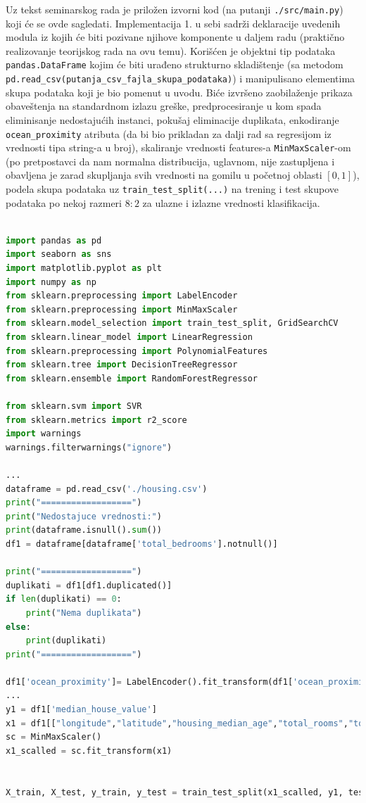 \documentclass[fontsize=12bp, paper=a4]{scrarticle}
\begin{document}



Uz tekst seminarskog rada je priložen izvorni kod (na putanji \verb|./src/main.py|) koji će se ovde sagledati. Implementacija 1. u sebi sadrži deklaracije uvedenih modula iz kojih će biti pozivane njihove komponente u daljem radu (praktično realizovanje teorijskog rada na ovu temu\cite{mojRad}). Korišćen je objektni tip podataka \verb|pandas.DataFrame|\cite{pandasDF} kojim će biti urađeno strukturno skladištenje (sa metodom \verb|pd.read_csv(putanja_csv_fajla_skupa_podataka)|) i manipulisano elementima skupa podataka koji je bio pomenut u uvodu. Biće izvršeno zaobilaženje prikaza obaveštenja na standardnom izlazu greške, predprocesiranje u kom spada eliminisanje nedostajućih instanci, pokušaj eliminacije duplikata, enkodiranje \verb|ocean_proximity| atributa (da bi bio prikladan za dalji rad sa regresijom iz vrednosti tipa string-a u broj)\cite{labelEncoding}, skaliranje vrednosti features-a \verb|MinMaxScaler|-om (po pretpostavci da nam normalna distribucija, uglavnom, nije zastupljena i obavljena je zarad skupljanja svih vrednosti na gomilu u početnoj oblasti $[0,1]$)\cite{scaleDist}, podela skupa podataka uz \verb|train_test_split(...)| na trening i test skupove podataka po nekoj razmeri $8:2$ za ulazne i izlazne vrednosti klasifikacija.\cite{train_test_split}


\begin{lstlisting}[language=Python, caption=Predprocesiranje podataka i navođenje modula koji će se koristiti]

import pandas as pd
import seaborn as sns
import matplotlib.pyplot as plt
import numpy as np
from sklearn.preprocessing import LabelEncoder
from sklearn.preprocessing import MinMaxScaler
from sklearn.model_selection import train_test_split, GridSearchCV
from sklearn.linear_model import LinearRegression
from sklearn.preprocessing import PolynomialFeatures
from sklearn.tree import DecisionTreeRegressor
from sklearn.ensemble import RandomForestRegressor

from sklearn.svm import SVR
from sklearn.metrics import r2_score
import warnings 
warnings.filterwarnings("ignore")

...
dataframe = pd.read_csv('./housing.csv')
print("==================")
print("Nedostajuce vrednosti:")
print(dataframe.isnull().sum())
df1 = dataframe[dataframe['total_bedrooms'].notnull()]

print("==================")
duplikati = df1[df1.duplicated()]
if len(duplikati) == 0:
	print("Nema duplikata")
else:
	print(duplikati)
print("==================")	

df1['ocean_proximity']= LabelEncoder().fit_transform(df1['ocean_proximity']) 
...
y1 = df1['median_house_value']
x1 = df1[["longitude","latitude","housing_median_age","total_rooms","total_bedrooms","population","households","median_income","ocean_proximity"]]
sc = MinMaxScaler()
x1_scalled = sc.fit_transform(x1)


X_train, X_test, y_train, y_test = train_test_split(x1_scalled, y1, test_size = 0.2)
\end{lstlisting}
\end{document}
